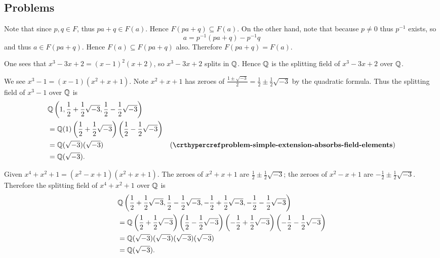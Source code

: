 \subsection*{Problems}
\begin{questions}
    \item Note that since $p, q \in F$, thus $pa + q \in F(a)$. Hence $F(pa+q) \subseteq F(a)$. On the other hand, note that because $p \neq 0$ thus $p^{-1}$ exists, so
    \[
        a = p^{-1}(pa+q) - p^{-1}q
    \]
    and thus $a \in F(pa+q)$. Hence $F(a) \subseteq F(pa+q)$ also. Therefore $F(pa+q) = F(a)$.

    \item \begin{partquestions}{\alph*}
        \item One sees that $x^3-3x+2 = (x-1)^2(x+2)$, so $x^3-3x+2$ splits in $\mathbb{Q}$. Hence $\mathbb{Q}$ is the splitting field of $x^3-3x+2$ over $\mathbb{Q}$.

        \item We see $x^3 - 1 = (x-1)(x^2+x+1)$. Note $x^2 + x + 1$ has zeroes of $\frac{1\pm\sqrt{-3}}{2} = \frac12 \pm \frac12\sqrt{-3}$ by the quadratic formula. Thus the splitting field of $x^3 - 1$ over $\mathbb{Q}$ is
        \begin{align*}
            &\Q\left(1, \frac12 + \frac12\sqrt{-3}, \frac12 - \frac12\sqrt{-3}\right)\\
            &=\Q(1)\left(\frac12 + \frac12\sqrt{-3}\right)\left(\frac12 - \frac12\sqrt{-3}\right)\\
            &=\Q(\sqrt{-3})(\sqrt{-3}) & (\myref{problem-simple-extension-absorbs-field-elements})\\
            &=\Q(\sqrt{-3}).
        \end{align*}

        \item Given $x^4 + x^2 + 1 = (x^2 - x + 1)(x^2 + x + 1)$. The zeroes of $x^2 + x + 1$ are $\frac12 \pm \frac12\sqrt{-3}$; the zeroes of $x^2 - x + 1$ are $-\frac12 \pm \frac12\sqrt{-3}$. Therefore the splitting field of $x^4 + x^2 + 1$ over $\mathbb{Q}$ is
        \begin{align*}
            &\mathbb{Q}\left(\frac12 + \frac12\sqrt{-3}, \frac12 - \frac12\sqrt{-3}, -\frac12 + \frac12\sqrt{-3}, -\frac12 - \frac12\sqrt{-3}\right)\\
            &=\mathbb{Q}\left(\frac12 + \frac12\sqrt{-3}\right)\left(\frac12 - \frac12\sqrt{-3}\right)\left(-\frac12 + \frac12\sqrt{-3}\right)\left(-\frac12 - \frac12\sqrt{-3}\right)\\
            &=\mathbb{Q}(\sqrt{-3})(\sqrt{-3})(\sqrt{-3})(\sqrt{-3})\\
            &= \mathbb{Q}(\sqrt{-3}).
        \end{align*}


\end{partquestions}
\end{questions}
